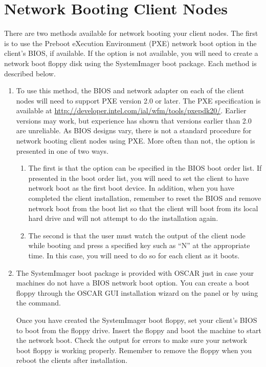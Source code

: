 %
%
%

\section{Network Booting Client Nodes}
\label{app:net-boot-client-nodes}

There are two methods available for network booting your client nodes.
The first is to use the Preboot eXecution Environment (PXE) network
boot option in the client's BIOS, if available. If the option is not
available, you will need to create a network boot floppy disk using
the SystemImager boot package. Each method is described below.

\begin{enumerate}
\item {} To use this method, the BIOS
  and network adapter on each of the client nodes will need to support
  PXE version 2.0 or later. The PXE specification is available at
  \url{http://developer.intel.com/ial/wfm/tools/pxepdk20/}.  Earlier
  versions may work, but experience has shown that versions earlier
  than 2.0 are unreliable. As BIOS designs vary, there is not a
  standard procedure for network booting client nodes using PXE.  More
  often than not, the option is presented in one of two ways.

  \begin{enumerate}
  \item The first is that the option can be specified in the BIOS boot
    order list. If presented in the boot order list, you will need to
    set the client to have network boot as the first boot device. In
    addition, when you have completed the client installation,
    remember to reset the BIOS and remove network boot from the boot
    list so that the client will boot from its local hard drive and
    will not attempt to do the installation again.
    
  \item The second is that the user must watch the output of the
    client node while booting and press a specified key such as ``N''
    at the appropriate time. In this case, you will need to do so for
    each client as it boots.
  \end{enumerate}
  
\item {} The
  SystemImager boot package is provided with OSCAR just in case your
  machines do not have a BIOS network boot option.  You can create a
  boot floppy through the OSCAR GUI installation wizard on the
   panel or by using the
   command.
  
  Once you have created the SystemImager boot floppy, set your
  client's BIOS to boot from the floppy drive. Insert the floppy and
  boot the machine to start the network boot. Check the output for
  errors to make sure your network boot floppy is working properly.
  Remember to remove the floppy when you reboot the clients after
  installation.
\end{enumerate}
